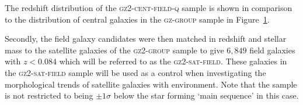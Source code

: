 \documentclass[useAMS,usenatbib]{mn2e}
\begin{document}
The redshift distribution of the \textsc{gz2-cent-field-q} sample is shown in comparison to the distribution of central galaxies in the \textsc{gz-group} sample in Figure~\ref{fig:zcompare}. %

Secondly, the field galaxy candidates were then matched in redshift and stellar mass to the satellite galaxies of the \textsc{gz2-group} sample to give $6,849$ field galaxies with $z < 0.084$ which will be referred to as the \textsc{gz2-sat-field}. These galaxies in the \textsc{gz2-sat-field} sample will be used as a control when investigating the morphological trends of satellite galaxies with environment. Note that the sample is not restricted to being $\pm1\sigma$ below the star forming `main sequence' in this case. %


\begin{figure}
\label{fig:zcompare}
\end{figure}
%
\end{document}
